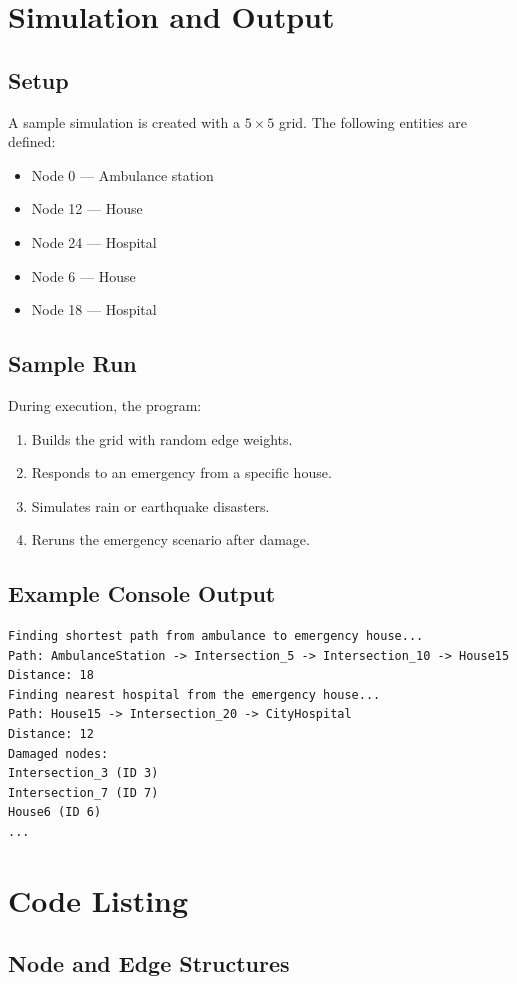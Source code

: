 \documentclass[12pt,a4paper]{report}
\begin{document}
\chapter{Simulation and Output}

\section{Setup}
A sample simulation is created with a $5 \times 5$ grid.
The following entities are defined:
\begin{itemize}
\item Node 0 — Ambulance station
\item Node 12 — House
\item Node 24 — Hospital
\item Node 6 — House
\item Node 18 — Hospital
\end{itemize}

\section{Sample Run}
During execution, the program:
\begin{enumerate}
\item Builds the grid with random edge weights.
\item Responds to an emergency from a specific house.
\item Simulates rain or earthquake disasters.
\item Reruns the emergency scenario after damage.
\end{enumerate}

\section{Example Console Output}
\begin{verbatim}
Finding shortest path from ambulance to emergency house...
Path: AmbulanceStation -> Intersection_5 -> Intersection_10 -> House15
Distance: 18
Finding nearest hospital from the emergency house...
Path: House15 -> Intersection_20 -> CityHospital
Distance: 12
Damaged nodes:
Intersection_3 (ID 3)
Intersection_7 (ID 7)
House6 (ID 6)
...
\end{verbatim}

\chapter{Code Listing}
\section{Node and Edge Structures}
\end{document}
